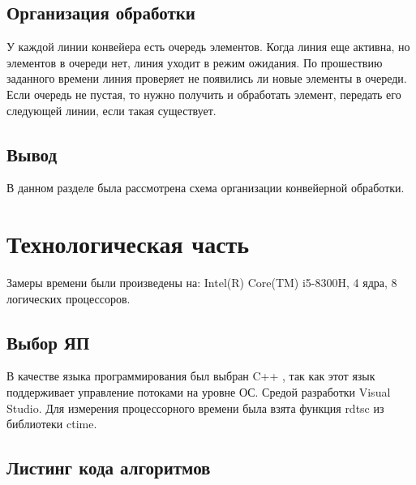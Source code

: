 \documentclass[12pt]{report}
\begin{document}
\section{Организация обработки}
У каждой линии конвейера есть очередь элементов. Когда линия еще активна, но элементов в очереди нет, линия уходит в режим ожидания.
По прошествию заданного времени линия проверяет не появились ли новые элементы в очереди. Если очередь не пустая, то нужно получить и обработать элемент, передать его следующей линии, если такая существует.

\section{Вывод}
В данном разделе была рассмотрена схема организации конвейерной обработки.

 

\chapter{Технологическая часть}
Замеры времени были произведены на: Intel(R) Core(TM) i5-8300H, 4 ядра, 8 логических процессоров.

\section{Выбор ЯП}
В качестве языка программирования был выбран C++ \cite{Microsoft}, так как этот
язык поддерживает управление потоками на уровне ОС. Средой разработки Visual Studio. 
Для измерения процессорного времени была взята функция
rdtsc из библиотеки ctime.

\section{Листинг кода алгоритмов}
\end{document}
